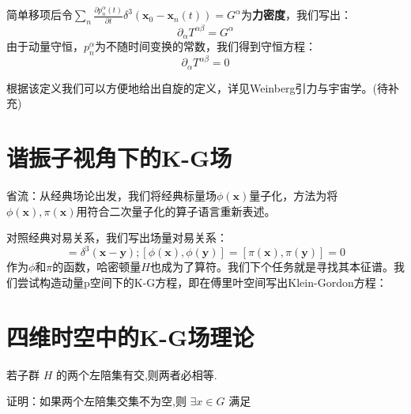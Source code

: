 \documentclass[../main.tex]{subfiles}
\begin{document}
    简单移项后令$\sum_{n} \frac{\partial p_n^{\alpha}(t)}{\partial t}\delta^3(\bm{x}_0 - \bm{x}_n(t)) = G^{\alpha}$为\textbf{力密度}，我们写出：
    \begin{equation}
        \partial_{\alpha} T^{\alpha\beta} = G^{\alpha}
    \end{equation}
    由于动量守恒，$p_n^{\alpha}$为不随时间变换的常数，我们得到守恒方程：
    \begin{equation}
        \partial_{\alpha} T^{\alpha\beta} = 0
    \end{equation}
    \begin{note}
        根据该定义我们可以方便地给出自旋的定义，详见Weinberg引力与宇宙学。(待补充)
    \end{note}
\section{谐振子视角下的K-G场}
省流：从经典场论出发，我们将经典标量场$\phi(\bm{x})$量子化，方法为将$\phi(\bm{x}),\pi(\bm{x})$用符合二次量子化的算子语言重新表述。

对照经典对易关系，我们写出场量对易关系：
\begin{equation}
    [\phi(\bm{x}), \pi(\bm{y})] = \delta^3(\bm{x} - \bm{y});[\phi(\bm{x}), \phi(\bm{y})] = [\pi(\bm{x}), \pi(\bm{y})] = 0
\end{equation}
作为$\phi$和$\pi$的函数，哈密顿量$H$也成为了算符。我们下个任务就是寻找其本征谱。我们尝试构造动量p空间下的K-G方程，即在傅里叶空间写出Klein-Gordon方程：

\section{四维时空中的K-G场理论}
\label{ch:1.4}


\begin{note}
    若子群 $H$ 的两个左陪集有交,则两者必相等.
\end{note}
    \noindent
    证明：如果两个左陪集交集不为空,则 $\exists x \in G$ 满足
\end{document}
